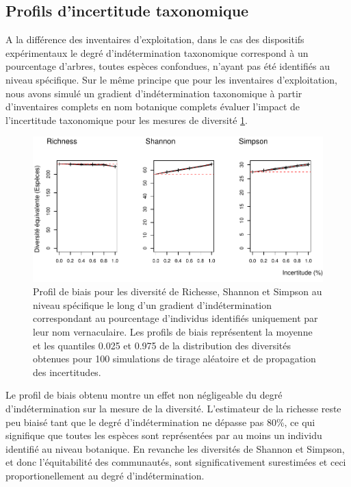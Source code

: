\documentclass[11pt,french,A4paper,extrafontsizes,onecolumn,openright]{memoir}
\begin{document}
\subsection{Profils d'incertitude
taxonomique}\label{profils-dincertitude-taxonomique}

A la différence des inventaires d'exploitation, dans le cas des
dispositifs expérimentaux le degré d'indétermination taxonomique
correspond à un pourcentage d'arbres, toutes espèces confondues, n'ayant
pas été identifiés au niveau spécifique. Sur le même principe que pour
les inventaires d'exploitation, nous avons simulé un gradient
d'indétermination taxonomique à partir d'inventaires complets en nom
botanique complets évaluer l'impact de l'incertitude taxonomique pour
les mesures de diversité \ref{fig:FigTreesSp}.

\begin{figure}

{\centering \includegraphics[width=1\linewidth]{MyBook_files/figure-latex/FigTreesSp-1} 

}

\caption{Profil de biais pour les diversité de Richesse, Shannon et Simpson au niveau spécifique le long d'un gradient d'indétermination correspondant au pourcentage d'individus identifiés uniquement par leur nom vernaculaire. Les profils de biais représentent la moyenne et les quantiles 0.025 et 0.975 de la distribution des diversités obtenues pour 100 simulations de tirage aléatoire et de propagation des incertitudes.}\label{fig:FigTreesSp}
\end{figure}

Le profil de biais obtenu montre un effet non négligeable du degré
d'indétermination sur la mesure de la diversité. L'estimateur de la
richesse reste peu biaisé tant que le degré d'indétermination ne dépasse
pas 80\%, ce qui signifique que toutes les espèces sont représentées par
au moins un individu identifié au niveau botanique. En revanche les
diversités de Shannon et Simpson, et donc l'équitabilité des
communautés, sont significativement surestimées et ceci
proportionellement au degré d'indétermination.
\end{document}

